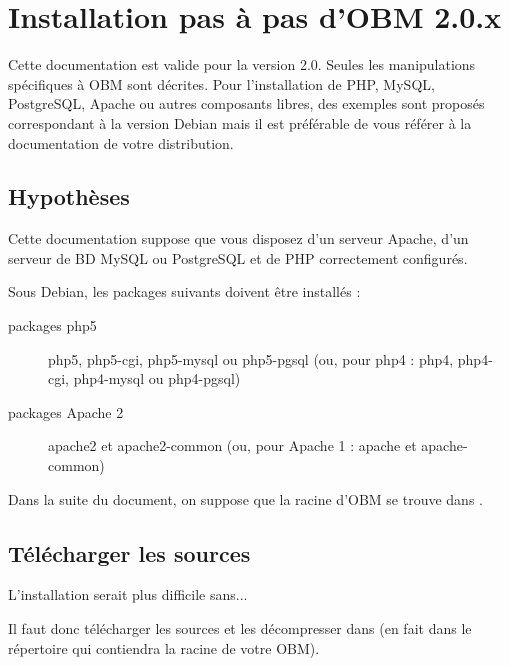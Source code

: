 \section{Installation pas à pas d'OBM 2.0.x}

Cette documentation est valide pour la version 2.0. Seules les
manipulations spécifiques à OBM sont décrites. Pour l'installation de
PHP, MySQL, PostgreSQL, Apache ou autres composants libres, des exemples sont proposés correspondant à la version Debian mais il est préférable de vous référer à la documentation de votre distribution.


\subsection{Hypothèses}

Cette documentation suppose que vous disposez d'un serveur Apache,
d'un serveur de BD MySQL ou PostgreSQL et de PHP correctement configurés. 

Sous Debian, les packages suivants doivent être installés :
\begin{description}
\item[packages php5 ] php5, php5-cgi, php5-mysql ou php5-pgsql (ou, pour php4 : php4, php4-cgi, php4-mysql ou php4-pgsql)
\item[packages Apache 2 ] apache2 et apache2-common (ou, pour Apache 1 : apache et apache-common)
\end{description}

Dans la suite du document, on suppose que la racine d'OBM se trouve
dans .

\subsection{Télécharger les sources}

L'installation serait plus difficile sans...

Il faut donc télécharger les sources et les décompresser dans
 (en fait dans le répertoire qui contiendra la
racine de votre OBM).


